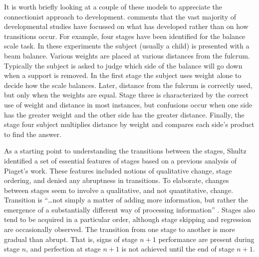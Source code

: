 It is worth briefly looking at a couple of these models to appreciate
the connectionist approach to development.  comments
that the vast majority of developmental studies have focussed on what
has developed rather than on how transitions occur.  For example, four
stages have been identified for the balance scale task.  In these
experiments the subject (usually a child) is presented with a beam
balance.  Various weights are placed at various distances from the
fulcrum.  Typically the subject is asked to judge which side of the
balance will go down when a support is removed.  In the first stage
the subject uses weight alone to decide how the scale
balances.  Later, distance from the fulcrum is correctly used, but
only when the weights are equal.  Stage three is characterized by the
correct use of weight and distance in most instances, but confusions
occur when one side has the greater weight and the other side has the
greater distance. Finally, the stage four subject multiplies distance
by weight and compares each side's product to find the answer.

As a starting point to understanding the transitions between the stages,
Shultz identified a set of essential features of stages based on a
previous analysis of Piaget's work.  These features included notions of
qualitative change, stage ordering, and denied any abruptness in transitions.
To elaborate, changes between stages seem to involve a qualitative, and not
quantitative, change.  Transition
is ``\ldots not simply a matter of adding more
information, but rather the emergence of a substantially different way of
processing information'' \cite[p.~105]{shulsimu}.  Stages also tend to be
acquired in a particular order, although stage skipping and regression are
occasionally observed.
The transition from one stage to another is more gradual
than abrupt.  That is, signs of stage $n+1$ performance are present during
stage $n$, and perfection at stage $n+1$ is not achieved until the end of
stage $n+1$.

